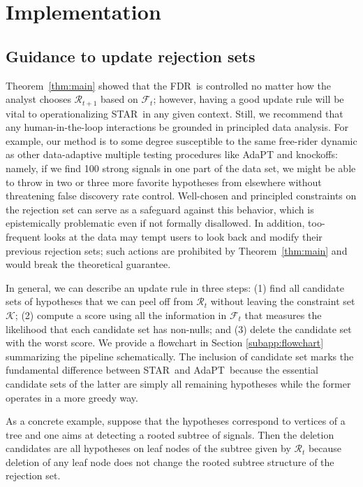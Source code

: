 \documentclass{biometrika}
\newcommand{\cF}{\mathcal{F}}
\newcommand{\cR}{\mathcal{R}}
\newcommand{\cK}{\mathcal{K}}
\newcommand{\textFDR}{FDR}
\renewcommand{\star}{STAR}
\newcommand{\adapt}{AdaPT}
\newcommand{\1}{\mathbf{1}}
\begin{document}
\section{Implementation}\label{sec:implementation}

\subsection{Guidance to update rejection sets}\label{subsec:guidance}

Theorem~\ref{thm:main} showed that the \textFDR ~is controlled no matter how the analyst chooses $\cR_{t+1}$ based on $\cF_t$; however, having a good update rule will be vital to operationalizing \star ~in any given context. Still, we recommend that any human-in-the-loop interactions be grounded in principled data analysis. For example, our method is to some degree susceptible to the same free-rider dynamic as other data-adaptive multiple testing procedures like AdaPT and knockoffs: namely, if we find 100 strong signals in one part of the data set, we might be able to throw in two or three more favorite hypotheses from elsewhere without threatening false discovery rate control. Well-chosen and principled constraints on the rejection set can serve as a safeguard against this behavior, which is epistemically problematic even if not formally disallowed. In addition, too-frequent looks at the data may tempt users to look back and modify their previous rejection sets; such actions are prohibited by Theorem~\ref{thm:main} and would break the theoretical guarantee.

In general, we can describe an update rule in three steps: (1) find all candidate sets of hypotheses that we can peel off from $\cR_t$ without leaving the constraint set $\cK$; (2) compute a score using all the information in $\cF_{t}$ that measures the likelihood that each candidate set has non-nulls; and (3) delete the candidate set with the worst score. We provide a flowchart in Section \ref{subapp:flowchart} summarizing the pipeline schematically. The inclusion of candidate set marks the fundamental difference between \star ~and \adapt ~because the essential candidate sets of the latter are simply all remaining hypotheses while the former operates in a more greedy way.

As a concrete example, suppose that the hypotheses correspond to vertices of a tree  and one aims at detecting a rooted subtree of signals. Then the deletion candidates are all hypotheses on leaf nodes of the subtree given by $\cR_{t}$ because deletion of any leaf node does not change the rooted subtree structure of the rejection set. 
\end{document}
